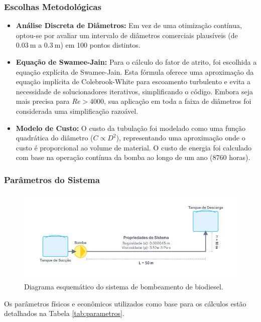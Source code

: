 \documentclass[12pt, a4paper]{article}
\begin{document}
        \subsubsection{Escolhas Metodológicas}
        \begin{itemize}
            \item \textbf{Análise Discreta de Diâmetros:} Em vez de uma otimização contínua, optou-se por avaliar um intervalo de diâmetros comerciais plausíveis (de $0.03~\mathrm{m}$ a $0.3~\mathrm{m}$) em 100 pontos distintos.
            \item \textbf{Equação de Swamee-Jain:} Para o cálculo do fator de atrito, foi escolhida a equação explícita de Swamee-Jain. Esta fórmula oferece uma aproximação da equação implícita de Colebrook-White para escoamento turbulento e evita a necessidade de solucionadores iterativos, simplificando o código. Embora seja mais precisa para $Re > 4000$, sua aplicação em toda a faixa de diâmetros foi considerada uma simplificação razoável. \cite{Swamee}
            \item \textbf{Modelo de Custo:} O custo da tubulação foi modelado como uma função quadrática do diâmetro ($C \propto D^2$), representando uma aproximação onde o custo é proporcional ao volume de material. O custo de energia foi calculado com base na operação contínua da bomba ao longo de um ano (8760 horas).
        \end{itemize}
        \vfill

        \subsubsection{Parâmetros do Sistema}
            \begin{figure}[H]
                \centering
                \includegraphics[width=1.0\textwidth, height=0.4\textheight, keepaspectratio]{diagrama_processo.png}
                \caption{Diagrama esquemático do sistema de bombeamento de biodiesel.}
                \label{fig:diagrama}
            \end{figure}
            Os parâmetros físicos e econômicos utilizados como base para os cálculos estão detalhados na Tabela \ref{tab:parametros}.
\end{document}
